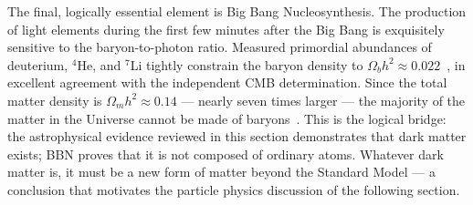 The final, logically essential element is Big Bang Nucleosynthesis.
The production of light elements during the first few minutes after the Big Bang is exquisitely sensitive to the baryon-to-photon ratio.
Measured primordial abundances of deuterium, $^4$He, and $^7$Li tightly constrain the baryon density to $\Omega_b h^2 \approx 0.022$~\cite{Cirelli:2024ssz}, in excellent agreement with the independent CMB determination.
Since the total matter density is $\Omega_m h^2 \approx 0.14$ --- nearly seven times larger --- the majority of the matter in the Universe cannot be made of baryons~\cite{Cirelli:2024ssz}.
This is the logical bridge: the astrophysical evidence reviewed in this section demonstrates that dark matter exists; BBN proves that it is not composed of ordinary atoms.
Whatever dark matter is, it must be a new form of matter beyond the Standard Model --- a conclusion that motivates the particle physics discussion of the following section.
